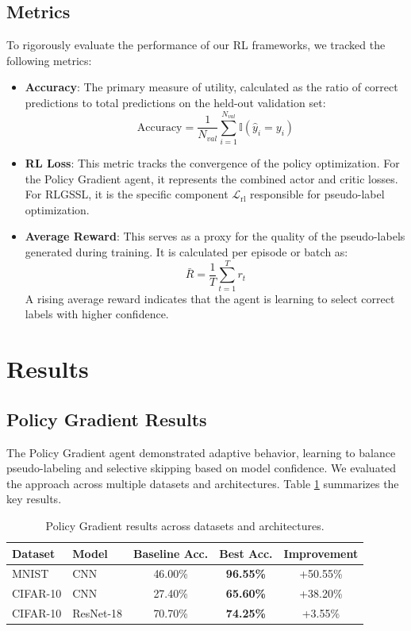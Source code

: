 \documentclass[pdflatex,sn-mathphys-num]{sn-jnl}%
\theoremstyle{thmstyleone}%
\theoremstyle{thmstyletwo}%
\theoremstyle{thmstylethree}%
\begin{document}
\subsection{Metrics}\label{subsec:metrics}
To rigorously evaluate the performance of our RL frameworks, we tracked the following metrics:

\begin{itemize}
    \item \textbf{Accuracy}: The primary measure of utility, calculated as the ratio of correct predictions to total predictions on the held-out validation set:
    \begin{equation}
        \text{Accuracy} = \frac{1}{N_{val}} \sum_{i=1}^{N_{val}} \mathbb{I}(\hat{y}_i = y_i)
    \end{equation}
    \item \textbf{RL Loss}: This metric tracks the convergence of the policy optimization. For the Policy Gradient agent, it represents the combined actor and critic losses. For RLGSSL, it is the specific component $\mathcal{L}_{\text{rl}}$ responsible for pseudo-label optimization.
    \item \textbf{Average Reward}: This serves as a proxy for the quality of the pseudo-labels generated during training. It is calculated per episode or batch as:
    \begin{equation}
        \bar{R} = \frac{1}{T} \sum_{t=1}^{T} r_t
    \end{equation}
    A rising average reward indicates that the agent is learning to select correct labels with higher confidence.
\end{itemize}

\section{Results}\label{sec:results}

\subsection{Policy Gradient Results}
The Policy Gradient agent demonstrated adaptive behavior, learning to balance pseudo-labeling and selective skipping based on model confidence. We evaluated the approach across multiple datasets and architectures. Table \ref{tab:pg_results} summarizes the key results.

\begin{table}[h]
\caption{Policy Gradient results across datasets and architectures.}\label{tab:pg_results}
\begin{tabular}{@{}llccc@{}}
\toprule
Dataset & Model & Baseline Acc. & Best Acc. & Improvement \\
\midrule
MNIST & CNN & 46.00\% & \textbf{96.55\%} & +50.55\% \\
CIFAR-10 & CNN & 27.40\% & \textbf{65.60\%} & +38.20\% \\
CIFAR-10 & ResNet-18 & 70.70\% & \textbf{74.25\%} & +3.55\% \\
\bottomrule
\end{tabular}
\end{table}
\end{document}
